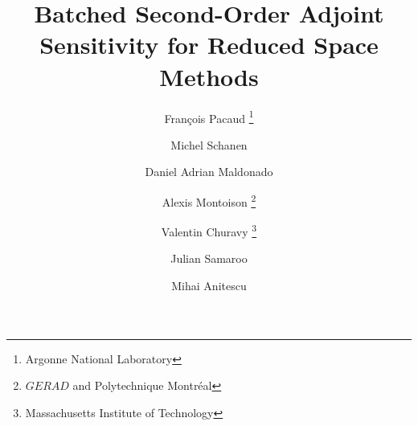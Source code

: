 \documentclass[twoside,leqno,twocolumn]{article}
\begin{document}
\newcommand\relatedversion{}


\title{\Large Batched Second-Order Adjoint Sensitivity for Reduced Space Methods\relatedversion}

\author{François Pacaud \thanks{Argonne National Laboratory}
  \and Michel Schanen \footnotemark[1]
  \and Daniel Adrian Maldonado \footnotemark[1]
\and Alexis Montoison \thanks{$GERAD$ and Polytechnique Montréal}
\and Valentin Churavy \thanks{Massachusetts Institute of Technology}
\and Julian Samaroo \footnotemark[3]
\and Mihai Anitescu \footnotemark[1]
}

\date{}
\maketitle




\end{document}
